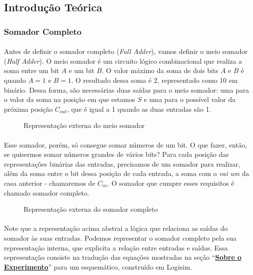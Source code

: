 \documentclass[a4paper,12pt]{article}
\begin{document}
\subsection{Introdução Teórica}

\subsubsection{Somador Completo}
\paragraph{}
Antes de definir o somador completo (\textit{Full Adder}), vamos definir o meio somador (\textit{Half Adder}). O meio somador é um circuito lógico combinacional que realiza a soma entre um bit $A$ e um bit $B$. O valor máximo da soma de dois bits $A$ e $B$ é quando $A = 1$ e $B = 1$. O resultado dessa soma é $2$, representado como $10$ em binário. Dessa forma, são necessárias duas saídas para o meio somador: uma para o valor da soma na posição em que estamos $S$ e uma para o possível valor da próxima posição $C_{out}$, que é igual a 1 quando as duas entradas são 1.

\begin{figure}[H]
    \centering
    
    \caption{Representação externa do meio somador}
\end{figure}

\paragraph{}
Esse somador, porém, só consegue somar números de um bit. O que fazer, então, se quisermos somar números grandes de vários bits? Para cada posição das representações binárias das entradas, precisamos de um somador para realizar, além da soma entre o bit dessa posição de cada entrada, a soma com o \textit{vai um} da casa anterior - chamaremos de $C_{in}$. O somador que cumpre esses requisitos é chamado somador completo.

\begin{figure}[H]
    \centering
    
    \caption{Representação externa do somador completo}
    \label{fig:somador_externa}
\end{figure}

\paragraph{}
Note que a representação acima abstrai a lógica que relaciona as saídas do somador às suas entradas. Podemos representar o somador completo pela sua representação interna, que explicita a relação entre entradas e saídas. Essa representação consiste na tradução das equações mostradas na seção ``\textbf{\hyperref[subsec:sobre_o_experimento]{Sobre o Experimento}}'' para um esquemático, construído em Logisim.
\end{document}
